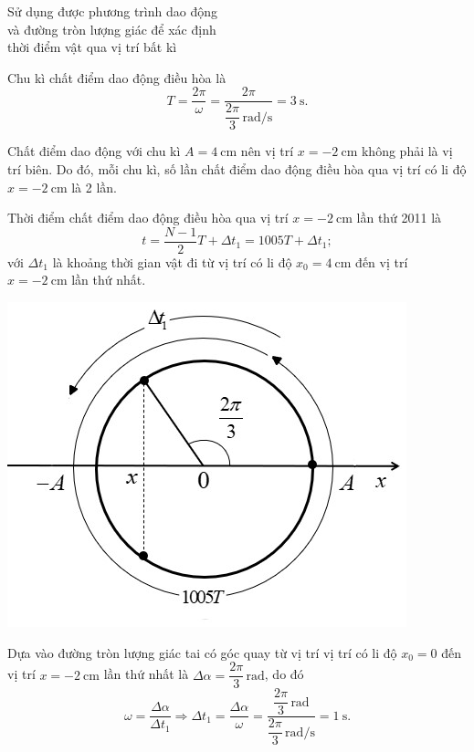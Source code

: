 \begin{dang}{Sử dụng được phương trình dao động\\ và đường tròn lượng giác để xác định\\ thời điểm vật qua vị trí bất kì}
{		Chu kì chất điểm dao động điều hòa là
		\begin{equation*}
			T=\dfrac{2\pi}{\omega}=\dfrac{2\pi}{\dfrac{2\pi}{3}\,\text{rad}/\text{s}}=\SI{3}{\second}.
		\end{equation*}
		
		Chất điểm dao động với chu kì $A=\SI{4}{\centi\meter}$ nên vị trí $x=\SI{-2}{\centi\meter}$ không phải là vị trí biên. Do đó, mỗi chu kì, số lần chất điểm dao động điều hòa qua vị trí có li độ $x=\SI{-2}{\centi\meter}$ là 2 lần.
		
		Thời điểm chất điểm dao động điều hòa qua vị trí $x=\SI{-2}{\centi\meter}$ lần thứ 2011 là
		\begin{equation*}
			t=\dfrac{N-1}{2}T+\Delta t_1=1005T+\Delta t_1;
		\end{equation*}
		với $\Delta t_1$ là khoảng thời gian vật đi từ vị trí có li độ $x_0=\SI{4}{\centi\meter}$ đến vị trí $x=\SI{-2}{\centi\meter}$ lần thứ nhất.
		
		\begin{center}
			\includegraphics[scale=0.7]{../figs/VN12-PH-02-A-001-4-V2-6.jpg}
		\end{center}
		
		Dựa vào đường tròn lượng giác tai có góc quay từ vị trí vị trí có li độ $x_0=0$ đến vị trí $x=\SI{-2}{\centi\meter}$ lần thứ nhất là $\Delta\alpha=\dfrac{2\pi}{3}\,\text{rad}$, do đó
		\begin{equation*}
			\omega=\dfrac{\Delta\alpha}{\Delta t_1}\Rightarrow\Delta t_1=\dfrac{\Delta\alpha}{	\omega}=\dfrac{\dfrac{2\pi}{3}\,\text{rad}}{\dfrac{2\pi}{3}\,\text{rad}/\text{s}}=\SI{1}{\second}.
		\end{equation*}
		
}
\end{dang}

